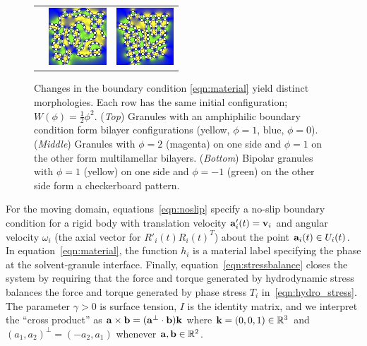 \begin{figure}
\begin{center}
\begin{tabular}{m{0.9in}m{0.9in}m{0.9in}}
      &\includegraphics[width=0.85in]{figures/SpecificAim1/N100A2.jpg}
      &\includegraphics[width=0.85in]{figures/SpecificAim1/N100A3.jpg} 
  \end{tabular}
  \end{center}
  \vspace{-20pt}
  \caption{\footnotesize \label{fig:self-assembly2} Changes in the
  boundary condition \eqref{eqn:material} yield distinct morphologies.
  Each row has the same initial configuration; $W(\phi) =
  \tfrac{1}{2}\phi^2$. (\emph{Top}) Granules with an amphiphilic
  boundary condition form bilayer configurations (yellow, $\phi = 1$,
  blue, $\phi = 0$). (\emph{Middle}) Granules with $\phi = 2$ (magenta)
  on one side and $\phi = 1$ on the other form multilamellar bilayers.
  (\emph{Bottom}) Bipolar granules with $\phi = 1$ (yellow) on one side
  and $\phi=-1$ (green) on the other side form a checkerboard pattern.}
\end{figure}

For the moving domain, equations~\eqref{eqn:noslip}
specify a no-slip boundary condition for a rigid body with translation
velocity $\aa'_i(t) = \vv_i$ and angular velocity $\omega_i$ (the axial
vector for $R'_i(t)R_i(t)^T$) about the point $\aa_i(t) \in U_i(t)$. In
equation~\eqref{eqn:material}, the function $h_i$ is a material label
specifying the phase at the solvent-granule interface. Finally,
equation~\eqref{eqn:stressbalance} closes the system by requiring that
the force and torque generated by hydrodynamic stress balances
the force and torque 
generated by phase stress $T_i$ in~\eqref{eqn:hydro_stress}. The
parameter $\gamma > 0$ is surface tension, $I$ is the identity matrix,
and we interpret the ``cross product'' as $\aa \times \bb = (\aa^{\perp} \cdot
\bb) \kk$ where $\kk = (0,0,1) \in \RR^3$ and $(a_1,a_2)^{\perp} =
(-a_2,a_1)$ whenever $\aa, \bb \in \mathbb{R}^2$.

